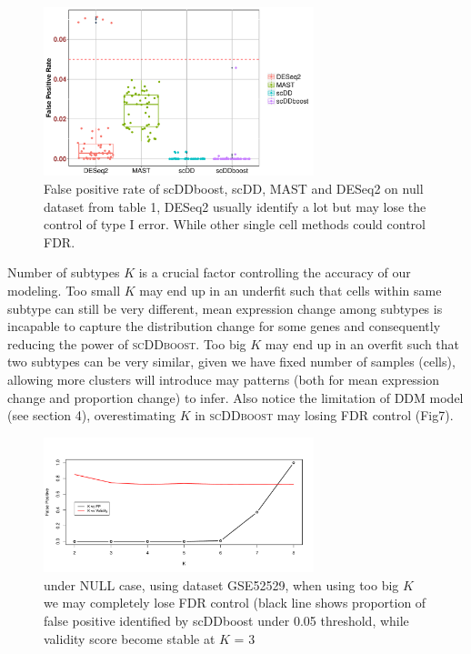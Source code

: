 \documentclass[aoas,preprint]{imsart}
\begin{document}
\begin{figure}[H]
\includegraphics[width = 0.7\textwidth]{Figs/fdr.pdf}
 \caption{False positive rate of scDDboost, scDD, MAST and DESeq2 on null dataset from table 1, DESeq2 usually identify a lot but may lose the control of type I error. While other single cell methods could control FDR. }
  \label{fig:7}
\end{figure}

Number of subtypes $K$ is a crucial factor controlling the accuracy of our modeling. 
Too small $K$ may end up in an underfit such that cells within same subtype can still be very different,
mean expression change among subtypes is incapable to capture the distribution change for some genes and consequently reducing the power of \textsc{scDDboost}.
Too big $K$ may end up in an overfit such that two subtypes can be very similar, given we have fixed number of samples (cells), allowing more clusters will introduce may patterns (both for mean expression change and proportion change) to infer. Also notice the limitation of DDM model (see section 4), overestimating $K$ in \textsc{scDDboost} may losing FDR control (Fig7).

\begin{figure}[H]
\includegraphics[width = 0.7\textwidth]{Figs/NULL.pdf}
 \caption{under NULL case, using dataset GSE52529, when using too big $K$ we may completely lose FDR control (black line shows proportion of false positive identified by scDDboost under 0.05 threshold, while validity score become stable at $K$ = 3 }
  \label{fig:7}
\end{figure}
\end{document}
